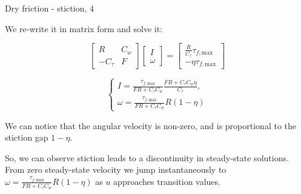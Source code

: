 \documentclass{beamer}
\begin{document}
\begin{frame}{Dry friction - stiction, 4}
	\begin{flushleft}
		
		We re-write it in matrix form and solve it: 
		
		\begin{equation}
			\begin{bmatrix}
				R & C_w \\
				-C_\tau & F
			\end{bmatrix}
		\begin{bmatrix}
			I \\
			\omega
		\end{bmatrix}
			=
		\begin{bmatrix}
			\frac{R}{C_\tau} \tau_{f, \text{max}} \\
			-\eta \tau_{f, \text{max}}
		\end{bmatrix}
		\end{equation}
	
	\begin{equation}
		\begin{cases}
			I = \frac{\tau_{f, \text{max}}}{FR+C_\tau C_w} \frac{FR+C_\tau C_w\eta}{C_\tau},
			\\
			\omega = \frac{\tau_{f, \text{max}}}{FR+C_\tau C_w}  R(1 - \eta)
		\end{cases}
	\end{equation}
		
		We can notice that the angular velocity is non-zero, and is proportional to the stiction gap $1 - \eta$.
		
		\bigskip
		
		So, we can observe stiction leads to a discontinuity in steady-state solutions. From zero steady-state velocity we jump instantaneously to $\omega = \frac{\tau_{f, \text{max}}}{FR+C_\tau C_w}  R(1 - \eta)$ as $u$ approaches transition values.
		
	\end{flushleft}
\end{frame}
\end{document}

